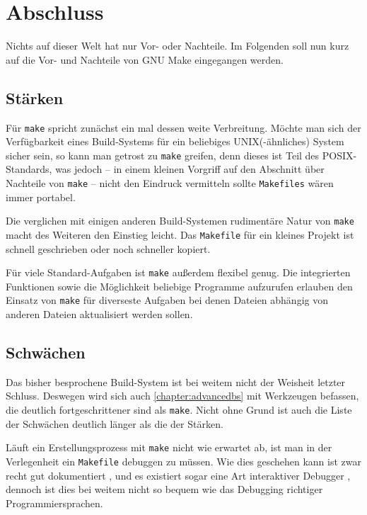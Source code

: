 \section{Abschluss}

Nichts auf dieser Welt hat nur Vor- oder Nachteile. Im Folgenden soll nun kurz
auf die Vor- und Nachteile von GNU Make eingegangen werden.

\subsection{Stärken}

Für \texttt{make} spricht zunächst ein mal dessen weite Verbreitung. Möchte man
sich der Verfügbarkeit eines Build-Systems für ein beliebiges UNIX(-ähnliches)
System sicher sein, so kann man getrost zu \texttt{make} greifen, denn dieses
ist Teil des POSIX-Standards, was jedoch -- in einem kleinen Vorgriff auf den
Abschnitt über Nachteile von \texttt{make} -- nicht den Eindruck vermitteln
sollte \texttt{Makefiles} wären immer portabel.

Die verglichen mit einigen anderen Build-Systemen rudimentäre Natur von
\texttt{make} macht des Weiteren den Einstieg leicht. Das \texttt{Makefile} für
ein kleines Projekt ist schnell geschrieben oder noch schneller kopiert.

Für viele Standard-Aufgaben ist \texttt{make} außerdem flexibel genug. Die
integrierten Funktionen sowie die Möglichkeit beliebige Programme aufzurufen
erlauben den Einsatz von \texttt{make} für diverseste Aufgaben bei denen Dateien
abhängig von anderen Dateien aktualisiert werden sollen.

\subsection{Schwächen} 

Das bisher besprochene Build-System ist bei weitem nicht der Weisheit letzter
Schluss. Deswegen wird sich auch \autoref{chapter:advancedbs} mit
Werkzeugen befassen, die deutlich fortgeschrittener sind als \texttt{make}.
Nicht ohne Grund ist auch die Liste der Schwächen deutlich länger als die der
Stärken.

Läuft ein Erstellungsprozess mit \texttt{make} nicht wie erwartet ab, ist man in
der Verlegenheit ein \texttt{Makefile} debuggen zu müssen. Wie dies geschehen
kann ist zwar recht gut dokumentiert ,
und es existiert sogar eine Art interaktiver Debugger ,
dennoch ist dies bei weitem nicht so bequem wie das Debugging richtiger
Programmiersprachen.

